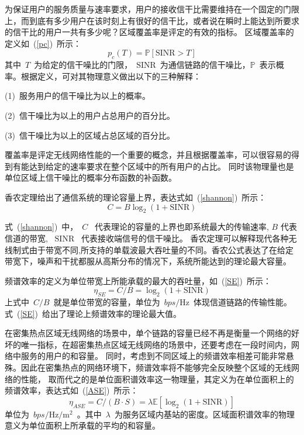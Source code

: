 为保证用户的服务质量与速率要求，用户的接收信干比需要维持在一个固定的门限上，而到底有多少用户在该时刻上有很好的信干比，或者说在瞬时上能达到所要求的信干比的用户一共有多少呢？区域覆盖率是评定的有效的指标。
区域覆盖率的定义如~(\ref{pc})~所示：
\begin{equation}\label{pc}
  p_c(T) = \mathbb{P}[\mathrm{SINR}>T]
\end{equation}
其中~$T$~为给定的信干噪比的门限，~$\mathrm{SINR}$~为通信链路的信干噪比，$\mathbb{P}$~表示概率。根据定义，可对其物理意义做出以下的三种解释：

 (1)~服务用户的信干噪比为以上的概率。

 (2)~信干噪比为以上的用户占总用户的百分比。

 (3)~信干噪比为以上的区域占总区域的百分比。

覆盖率是评定无线网络性能的一个重要的概念，并且根据覆盖率，可以很容易的得到有能达到给定的速率要求在整个区域中的所有用户的占比。
同时该物理量也是单位区域上信干噪比的概率分布函数的补函数。

香农定理给出了通信系统的理论容量上界，表达式如~(\ref{shannon})~所示：
\begin{equation}\label{shannon}
  C = B \log_2(1+\mathrm{SINR})
\end{equation}

式~(\ref{shannon})~中，~$C$~ 代表理论的容量的上界也即系统最大的传输速率, $B$ 代表信道的带宽, ~$\mathrm{SINR}$~ 代表接收端信号的信干噪比。
香农定理可以解释现代各种无线制式由于带宽不同,所支持的单载波最大吞吐量的不同。香农公式表达了在给定带宽下，噪声和干扰都服从高斯分布的情况下，系统所能达到的理论最大容量。

频谱效率的定义为单位带宽上所能承载的最大的吞吐量，如~(\ref{SE})~所示：
\begin{equation}\label{SE}
\eta_{SE}=C/B=\log_2(1+\mathrm{SINR})
\end{equation}
上式中~$C/B$~就是单位带宽的容量，单位为~$bps/\mathrm{Hz}$~体现信道链路的传输性能。式~(\ref{SE})~给出了理论上频谱效率的理论最大值。

在密集热点区域无线网络的场景中，单个链路的容量已经不再是衡量一个网络的好坏的唯一指标，在超密集热点区域无线网络的场景中，还要考虑在一段时间内，网络中服务的用户的和容量。
同时，考虑到不同区域上的频谱效率相差可能非常悬殊。因此在密集热点的网络环境下，频谱效率将不能够完全反映整个区域的无线网络的性能，
取而代之的是单位面积谱效率这一物理量，其定义为在单位面积上的频谱效率，表达式如~(\ref{ASE})~所示：
\begin{equation}\label{ASE}
  \eta_{ASE}=C/(B\cdot S) = \lambda\mathbb{E}[\log_2(1+\mathrm{SINR})]
\end{equation}
单位为~$bps/\mathrm{Hz}/\mathrm{m}^2$~。其中~$\lambda$~为服务区域内基站的密度。区域面积谱效率的物理意义为单位面积上所承载的平均的和容量。

